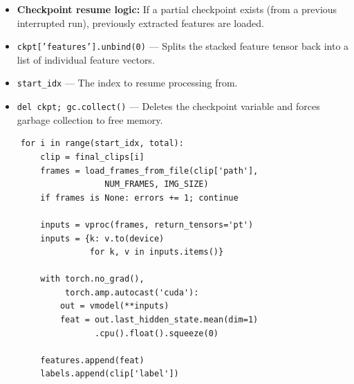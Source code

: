 \begin{explanation}
\begin{itemize}[nosep]
  \item \textbf{Checkpoint resume logic:} If a partial checkpoint exists (from a previous interrupted run), previously extracted features are loaded.
  \item \texttt{ckpt['features'].unbind(0)} --- Splits the stacked feature tensor back into a list of individual feature vectors.
  \item \texttt{start\_idx} --- The index to resume processing from.
  \item \texttt{del ckpt; gc.collect()} --- Deletes the checkpoint variable and forces garbage collection to free memory.
\end{itemize}
\end{explanation}

\begin{lstlisting}
    for i in range(start_idx, total):
        clip = final_clips[i]
        frames = load_frames_from_file(clip['path'],
                     NUM_FRAMES, IMG_SIZE)
        if frames is None: errors += 1; continue

        inputs = vproc(frames, return_tensors='pt')
        inputs = {k: v.to(device)
                  for k, v in inputs.items()}

        with torch.no_grad(),
             torch.amp.autocast('cuda'):
            out = vmodel(**inputs)
            feat = out.last_hidden_state.mean(dim=1)
                   .cpu().float().squeeze(0)

        features.append(feat)
        labels.append(clip['label'])
\end{lstlisting}

